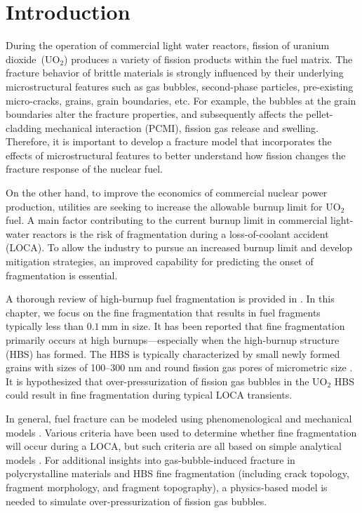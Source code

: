 \section{Introduction}
\label{section: brittle/intro}

During the operation of commercial light water reactors, fission of uranium dioxide~(UO$_2$) produces a variety of fission products within the fuel matrix. The fracture behavior of brittle materials is strongly influenced by their underlying microstructural features such as gas bubbles, second-phase particles, pre-existing micro-cracks, grains, grain boundaries, etc. For example, the bubbles at the grain boundaries alter the fracture properties, and subsequently affects the pellet-cladding mechanical interaction (PCMI), fission gas release and swelling. Therefore, it is important to develop a fracture model that incorporates the effects of microstructural features to better understand how fission changes the fracture response of the nuclear fuel.

On the other hand, to improve the economics of commercial nuclear power production, utilities are seeking to increase the allowable burnup limit for UO$_2$ fuel. A main factor contributing to the current burnup limit in commercial light-water reactors is the risk of fragmentation during a loss-of-coolant accident (LOCA). To allow the industry to pursue an increased burnup limit and develop mitigation strategies, an improved capability for predicting the onset of fragmentation is essential.

A thorough review of high-burnup fuel fragmentation is provided in \cite{CAPPS2021152750}. In this chapter, we focus on the fine fragmentation that results in fuel fragments typically less than $\SI{0.1}{\milli\meter}$ in size. It has been reported that fine fragmentation primarily occurs at high burnups---especially when the high-burnup structure (HBS) has formed. The HBS is typically characterized by small newly formed grains with sizes of 100--300 nm and round fission gas pores of micrometric size \cite{RONDINELLA201024}. It is hypothesized that over-pressurization of fission gas bubbles in the UO$_2$ HBS could result in fine fragmentation during typical LOCA transients.

In general, fuel fracture can be modeled using phenomenological \cite{Turnbull2015} and mechanical models \cite{JIANG2020106713}. Various criteria have been used to determine whether fine fragmentation will occur during a LOCA, but such criteria are all based on simple analytical models \cite{KULACSY2015409, JERNKVIST2020103188}. For additional insights into gas-bubble-induced fracture in polycrystalline materials and HBS fine fragmentation (including crack topology, fragment morphology, and fragment topography), a physics-based model is needed to simulate over-pressurization of fission gas bubbles.


